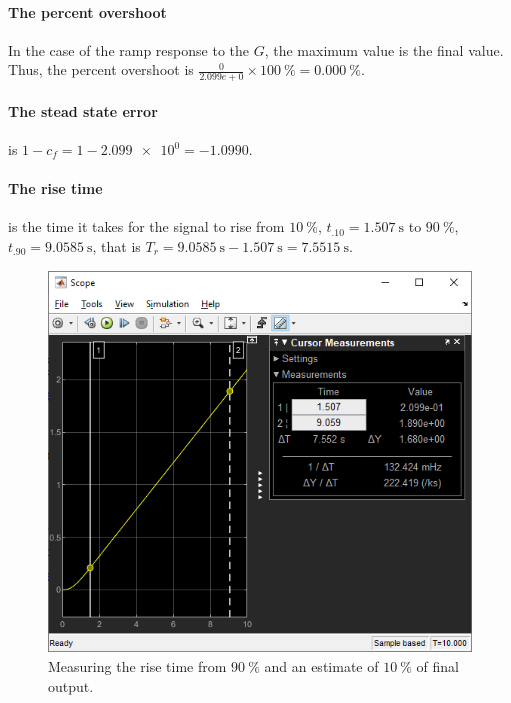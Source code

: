 \documentclass[12pt]{article}
\begin{document}
\paragraph{The percent overshoot}
In the case of the ramp response to the $G$, the maximum value is the final value.
Thus, the percent overshoot is $\frac{0}{2.099e+0} \times \SI{100}\percent = \SI{0.000}\percent$.

\paragraph{The stead state error} is $1 - c_f = 1 - \num{2.099e+0} = -1.0990$.

\paragraph{The rise time} is the time it takes for the signal to rise
from $\SI{10}\percent$, $t_{.10} = \SI{1.507}\second$
to $\SI{90}\percent$, $t_{.90} = \SI{9.0585}\second$,
that is $T_r = \SI{9.0585}\second - \SI{1.507}\second = \SI{7.5515}\second$.

\begin{figure}[h]
    \centering
    \includegraphics[width=\linewidth]{part01b_measuring_rise_time.png}
    \caption{Measuring the rise time from $\SI{90}\percent$ and an estimate of $\SI{10}\percent$ of final output.}
    \label{fig:ramp - measuring rise time}
\end{figure}
\end{document}
